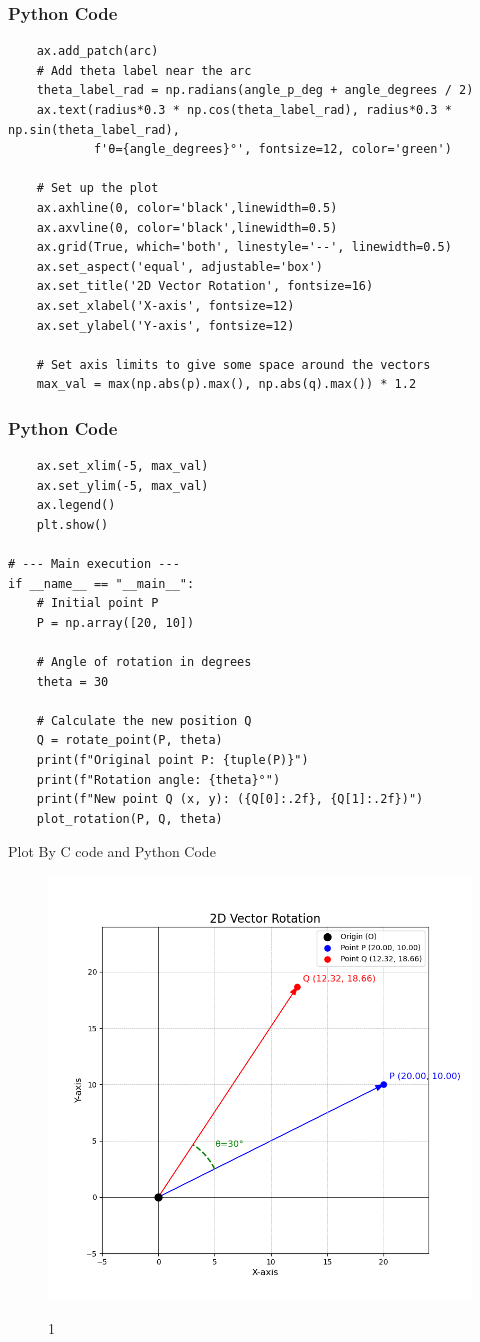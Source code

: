 \documentclass{beamer}
\begin{document}
\begin{frame}[fragile]
\frametitle{Python Code}
\begin{lstlisting}
    ax.add_patch(arc)
    # Add theta label near the arc
    theta_label_rad = np.radians(angle_p_deg + angle_degrees / 2)
    ax.text(radius*0.3 * np.cos(theta_label_rad), radius*0.3 * np.sin(theta_label_rad),
            f'θ={angle_degrees}°', fontsize=12, color='green')

    # Set up the plot
    ax.axhline(0, color='black',linewidth=0.5)
    ax.axvline(0, color='black',linewidth=0.5)
    ax.grid(True, which='both', linestyle='--', linewidth=0.5)
    ax.set_aspect('equal', adjustable='box')
    ax.set_title('2D Vector Rotation', fontsize=16)
    ax.set_xlabel('X-axis', fontsize=12)
    ax.set_ylabel('Y-axis', fontsize=12)

    # Set axis limits to give some space around the vectors
    max_val = max(np.abs(p).max(), np.abs(q).max()) * 1.2
    \end{lstlisting}
\end{frame}
\begin{frame}[fragile]
\frametitle{Python Code}
\begin{lstlisting}
    ax.set_xlim(-5, max_val)
    ax.set_ylim(-5, max_val)
    ax.legend()
    plt.show()

# --- Main execution ---
if __name__ == "__main__":
    # Initial point P
    P = np.array([20, 10])

    # Angle of rotation in degrees
    theta = 30

    # Calculate the new position Q
    Q = rotate_point(P, theta)
    print(f"Original point P: {tuple(P)}")
    print(f"Rotation angle: {theta}°")
    print(f"New point Q (x, y): ({Q[0]:.2f}, {Q[1]:.2f})")
    plot_rotation(P, Q, theta)
\end{lstlisting}
\end{frame}
\begin{frame}{Plot By C code and Python Code}
    \begin{figure}
    \centering
    \includegraphics[width=0.7\columnwidth]{figs/Figure_1.png}
    \label{fig:placeholder}
    \caption{1}
\end{figure}
\end{frame}
\end{document}
